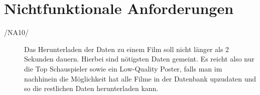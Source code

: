\section{Nichtfunktionale Anforderungen}

\begin{description}
\item[/NA10/] Das Herunterladen der Daten zu einem Film soll nicht länger als 2 Sekunden dauern. Hierbei sind nötigsten Daten gemeint. Es reicht also nur die Top Schauspieler sowie ein Low-Quality Poster, falls man im nachhinein die Möglichkeit hat alle Filme in der Datenbank upzudaten und so die restlichen Daten herunterladen kann.
\end{description}
